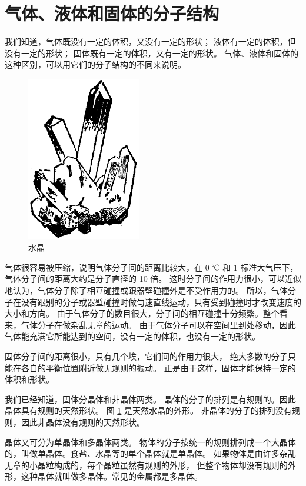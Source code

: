 \section{气体、液体和固体的分子结构}\label{sec:5-2}

我们知道，气体既没有一定的体积，又没有一定的形状；
液体有一定的体积，但没有一定的形状；
固体既有一定的体积，又有一定的形状。
气体、液体和固体的这种区别，可以用它们的分子结构的不同来说明。

\begin{figure}
    \centering
    \includegraphics[width=5cm]{../pic/czwl2-ch5-3}
    \caption{水晶}\label{fig:5-3}
\end{figure}

气体很容易被压缩，说明气体分子间的距离比较大，在 0 ℃ 和 1 标准大气压下，
气体分子间的距离大约是分子直径的 10 倍。
这时分子间的作用力很小，可以近似地认为，气体分子除了相互碰撞或跟器壁碰撞外是不受作用力的。
所以，气体分子在没有跟别的分子或器壁碰撞时做匀速直线运动，只有受到碰撞时才改变速度的大小和方向。
由于气体分子的数目很大，分子间的相互碰撞十分频繁。整个看来，气体分子在做杂乱无章的运动。
由于气体分子可以在空间里到处移动，因此气体能充满它所能达到的空间，没有一定的体积，也没有一定的形状。

固体分子间的距离很小，只有几个埃，它们间的作用力很大，
绝大多数的分子只能在各自的平衡位置附近做无规则的振动。
正是由于这样，固体才能保持一定的体积和形状。

我们已经知道，固体分晶体和非晶体两类。
晶体的分子的排列是有规则的。因此晶体具有规则的天然形状。
图 \ref{fig:5-3} 是天然水晶的外形。
非晶体的分子的排列没有规则，因此非晶体没有规则的天然形状。

晶体又可分为单晶体和多晶体两类。
物体的分子按统一的规则排列成一个大晶体的，叫做单晶体。食盐、水晶等的单个晶体就是单晶体。
如果物体是由许多杂乱无章的小晶粒构成的，每个晶粒虽然有规则的外形，
但整个物体却没有规则的外形，这种晶体就叫做多晶体。常见的金属都是多晶体。

